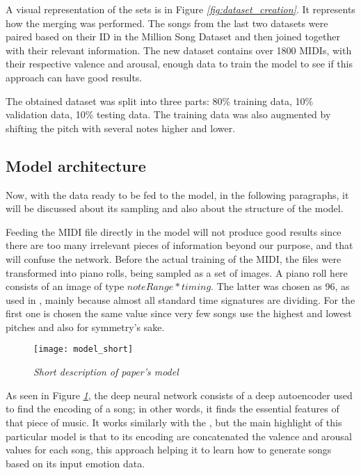 A visual representation of the sets is in Figure \emph{\ref{fig:dataset_creation}}.
It represents how the merging was performed.
The songs from the last two datasets were paired based on their
ID in the Million Song Dataset and then joined together with their relevant information.
The new dataset contains over 1800 MIDIs, with their respective valence and arousal,
enough data to train the model to see if this approach can have good results.

The obtained dataset was split into three parts: 80\% training data,
10\% validation data, 10\% testing data.
The training data was also augmented by shifting the pitch with several notes higher and lower.

\subsection{Model architecture}
Now, with the data ready to be fed to the model,
in the following paragraphs,
it will be discussed about its sampling and also about the structure of the model.

Feeding the MIDI file directly in the model
will not produce good results since there are too many irrelevant pieces of information
beyond our purpose, and that will confuse the network.
Before the actual training of the MIDI,
the files were transformed into piano rolls,
being sampled as a set of images.
A piano roll here consists of an image of type $noteRange * timing$.
The latter was chosen as 96, as used in \cite{hackerPoet},
mainly because almost all standard time signatures are dividing.
For the first one is chosen the same value since very few songs use the highest
and lowest pitches and also for symmetry's sake.

\begin{figure}[h]
  \centering
  \texttt{[image: model\_short]}
  \caption{\emph{Short description of paper's model}}
  \label{fig:model_short}
\end{figure}

As seen in Figure \emph{\ref{fig:model_short}},
the deep neural network consists of a deep autoencoder used to find the encoding of a song;
in other words, it finds the essential features of that piece of music.
It works similarly with the \cite{hackerPoet},
but the main highlight of this particular model is that to its encoding
are concatenated the valence and arousal values for each song,
this approach helping it to learn how to generate songs based on its input emotion data.


